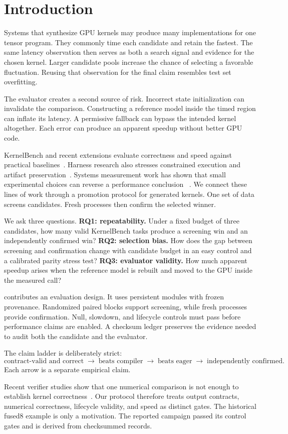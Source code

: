 \section{Introduction}

Systems that synthesize GPU kernels may produce many implementations for one
tensor program. They commonly time each candidate and retain the fastest. The
same latency observation then serves as both a search signal and evidence for
the chosen kernel. Larger candidate pools increase the chance of selecting a
favorable fluctuation. Reusing that observation for the final claim resembles
test set overfitting.

The evaluator creates a second source of risk. Incorrect state initialization
can invalidate the comparison. Constructing a reference model inside the timed
region can inflate its latency. A permissive fallback can bypass the intended
kernel altogether. Each error can produce an apparent speedup without better
GPU code.

KernelBench and recent extensions evaluate correctness and speed against
practical baselines~\citep{kernelbench2025,zhang2026kernelbenchverified,lange2025robustkbench}.
Harness research also stresses constrained execution and artifact
preservation~\citep{shui2026harness}. Systems measurement work has shown that
small experimental choices can reverse a performance conclusion
~\citep{mytkowicz2009wrongdata,curtsinger2013stabilizer}. We connect these lines
of work through a promotion protocol for generated kernels. One set of data
screens candidates. Fresh processes then confirm the selected winner.

We ask three questions. \textbf{RQ1: repeatability.} Under a fixed budget of
three candidates, how many valid KernelBench tasks produce a screening win and
an independently confirmed win? \textbf{RQ2: selection bias.} How does the gap
between screening and confirmation change with candidate budget in an easy
control and a calibrated parity stress test? \textbf{RQ3: evaluator validity.}
How much apparent speedup arises when the reference model is rebuilt and moved
to the GPU inside the measured call?

\system{} contributes an evaluation design. It uses persistent modules with
frozen provenance. Randomized paired blocks support screening, while fresh
processes provide confirmation. Null, slowdown, and lifecycle controls must pass
before performance claims are enabled. A checksum ledger preserves the evidence
needed to audit both the candidate and the evaluator.

The claim ladder is deliberately strict:
\[
\text{contract-valid and correct}
\;\rightarrow\; \text{beats compiler}
\;\rightarrow\; \text{beats eager}
\;\rightarrow\; \text{independently confirmed}.
\]
Each arrow is a separate empirical claim.

Recent verifier studies show that one numerical comparison is not enough to
establish kernel correctness~\citep{shah2026contractgrade,li2026correctslow}.
Our protocol therefore treats output contracts, numerical correctness,
lifecycle validity, and speed as distinct gates. The historical fused8 example
is only a motivation. The reported campaign passed its control gates and is
derived from checksummed records.
